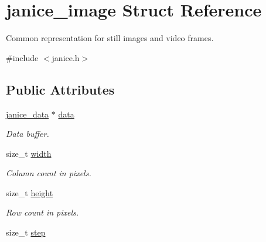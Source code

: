 \hypertarget{structjanice__image}{}\section{janice\+\_\+image Struct Reference}
\label{structjanice__image}


Common representation for still images and video frames.  




{\ttfamily \#include $<$janice.\+h$>$}

\subsection*{Public Attributes}
\begin{DoxyCompactItemize}
\item 
\hypertarget{structjanice__image_a2805270d1ff18acf887f22207af4685b}{}\hyperlink{group__janice_ga63103e7e1c9df7d7403640223f3f6f07}{janice\+\_\+data} $\ast$ \hyperlink{structjanice__image_a2805270d1ff18acf887f22207af4685b}{data}\label{structjanice__image_a2805270d1ff18acf887f22207af4685b}

\begin{DoxyCompactList}\small\item\em Data buffer. \end{DoxyCompactList}\item 
\hypertarget{structjanice__image_a449afa0118eb6377d50e9534e2cdecab}{}size\+\_\+t \hyperlink{structjanice__image_a449afa0118eb6377d50e9534e2cdecab}{width}\label{structjanice__image_a449afa0118eb6377d50e9534e2cdecab}

\begin{DoxyCompactList}\small\item\em Column count in pixels. \end{DoxyCompactList}\item 
\hypertarget{structjanice__image_a40f4c66d7f0d89ea439b02f60c224736}{}size\+\_\+t \hyperlink{structjanice__image_a40f4c66d7f0d89ea439b02f60c224736}{height}\label{structjanice__image_a40f4c66d7f0d89ea439b02f60c224736}

\begin{DoxyCompactList}\small\item\em Row count in pixels. \end{DoxyCompactList}\item 
\hypertarget{structjanice__image_aa4e245b8861d67dda7a46b3aa7d66df4}{}size\+\_\+t \hyperlink{structjanice__image_aa4e245b8861d67dda7a46b3aa7d66df4}{step}\label{structjanice__image_aa4e245b8861d67dda7a46b3aa7d66df4}


\end{DoxyCompactItemize}
